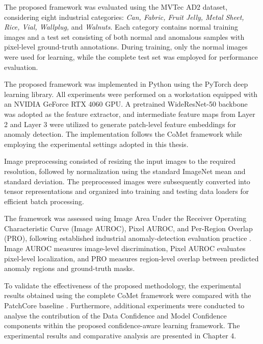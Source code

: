\documentclass[12pt,openany,oneside]{book}
\begin{document}
The proposed framework was evaluated using the MVTec AD2 dataset, considering eight industrial categories: \textit{Can, Fabric, Fruit Jelly, Metal Sheet, Rice, Vial, Wallplug,} and \textit{Walnuts}. Each category contains normal training images and a test set consisting of both normal and anomalous samples with pixel-level ground-truth annotations. During training, only the normal images were used for learning, while the complete test set was employed for performance evaluation.

The proposed framework was implemented in Python using the PyTorch deep learning library. All experiments were performed on a workstation equipped with an NVIDIA GeForce RTX 4060 GPU. A pretrained WideResNet-50 backbone was adopted as the feature extractor, and intermediate feature maps from Layer 2 and Layer 3 were utilized to generate patch-level feature embeddings for anomaly detection. The implementation follows the CoMet framework while employing the experimental settings adopted in this thesis.

Image preprocessing consisted of resizing the input images to the required resolution, followed by normalization using the standard ImageNet mean and standard deviation. The preprocessed images were subsequently converted into tensor representations and organized into training and testing data loaders for efficient batch processing.

The framework was assessed using Image Area Under the Receiver Operating Characteristic Curve (Image AUROC), Pixel AUROC, and Per-Region Overlap (PRO), following established industrial anomaly-detection evaluation practice \cite{bergmann2019mvtec,hecklerkram2026mvtecad2}. Image AUROC measures image-level discrimination, Pixel AUROC evaluates pixel-level localization, and PRO measures region-level overlap between predicted anomaly regions and ground-truth masks.

To validate the effectiveness of the proposed methodology, the experimental results obtained using the complete CoMet framework were compared with the PatchCore baseline \cite{roth2022patchcore}. Furthermore, additional experiments were conducted to analyse the contribution of the Data Confidence and Model Confidence components within the proposed confidence-aware learning framework. The experimental results and comparative analysis are presented in Chapter 4.



\end{document}
